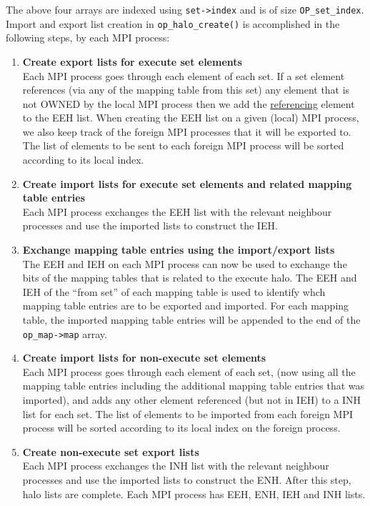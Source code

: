 \documentclass[12pt]{article}
\begin{document}
\noindent The above four arrays are indexed using \texttt{set->index} and is of size \texttt{OP\_set\_index}. Import and
export list creation in \texttt{op\_halo\_create()} is accomplished in the following steps, by each MPI process:
\begin{enumerate}
\item \textbf{Create export lists for execute set elements}\\
Each MPI process goes through each element of each set. If a set element references (via any of the mapping table from
this set) any element that is not OWNED by the local MPI process then we add the \underline{referencing} element to the
EEH list. When creating the EEH list on a given (local) MPI process, we also keep track of the foreign MPI processes
that it will be exported to. The list of elements to be sent to each foreign MPI process will be sorted according to its
local index.

\item \textbf{Create import lists for execute set elements and related mapping table entries}\\
Each MPI process exchanges the EEH list with the relevant neighbour processes and use the imported lists to
construct the IEH.

\item \textbf{Exchange mapping table entries using the import/export lists}\\
The EEH and IEH on each MPI process can now be used to exchange the bits of the mapping tables that is related to the
execute halo. The EEH and IEH of the ``from set'' of each mapping table is used to identify whch mapping table entries
are to be exported and imported. For each mapping table, the imported mapping table entries will be appended to the end
of the \texttt{op\_map->map} array. 

\item \textbf{Create import lists for non-execute set elements }\\
Each MPI process goes through each element of each set, (now using all the mapping table entries including the
additional mapping table entries that was imported), and adds any other element referenced (but not in IEH) to a INH
list for each set. The list of elements to be imported from each foreign MPI process will be sorted according to its
local index on the foreign process.

\item \textbf{Create non-execute set export lists}\\
Each MPI process exchanges the INH list with the relevant neighbour processes and use the imported lists to
construct the ENH. After this step, halo lists are complete. Each MPI process has EEH, ENH, IEH and INH lists.


\end{enumerate}
\end{document}
